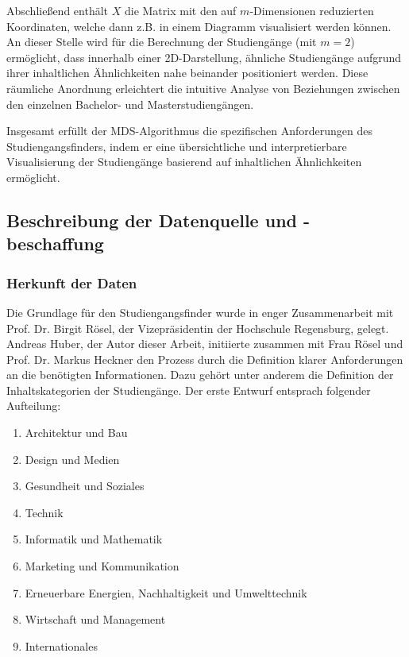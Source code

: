 Abschließend enthält $ X $ die Matrix mit den auf $ m $-Dimensionen reduzierten
Koordinaten, welche dann z.B. in einem Diagramm visualisiert werden können.
An dieser Stelle wird für die Berechnung der Studiengänge (mit $ m = 2 $)
ermöglicht, dass innerhalb einer 2D-Darstellung, ähnliche Studiengänge aufgrund
ihrer inhaltlichen Ähnlichkeiten nahe beinander positioniert werden. Diese
räumliche Anordnung erleichtert die intuitive Analyse von Beziehungen zwischen
den einzelnen Bachelor- und Masterstudiengängen.

Insgesamt erfüllt der MDS-Algorithmus die spezifischen Anforderungen des
Studiengangsfinders, indem er eine übersichtliche und interpretierbare
Visualisierung der Studiengänge basierend auf inhaltlichen Ähnlichkeiten
ermöglicht.

\subsection{Beschreibung der Datenquelle und -beschaffung}\label{sec:datenquelle}
\subsubsection{Herkunft der Daten}\label{sec:herkunft-der-daten}
Die Grundlage für den Studiengangsfinder wurde in enger Zusammenarbeit mit Prof. Dr. Birgit Rösel, der Vizepräsidentin der Hochschule Regensburg, gelegt. Andreas Huber, der Autor dieser Arbeit, initiierte zusammen mit Frau Rösel und Prof. Dr. Markus Heckner den Prozess durch die Definition klarer Anforderungen an die benötigten Informationen. Dazu gehört unter anderem die Definition der Inhaltskategorien der Studiengänge. Der erste Entwurf entsprach folgender Aufteilung:

\begin{enumerate}
    \item Architektur und Bau
    \item Design und Medien
    \item Gesundheit und Soziales
    \item Technik
    \item Informatik und Mathematik
    \item Marketing und Kommunikation
    \item Erneuerbare Energien, Nachhaltigkeit und Umwelttechnik
    \item Wirtschaft und Management
    \item Internationales
\end{enumerate}


